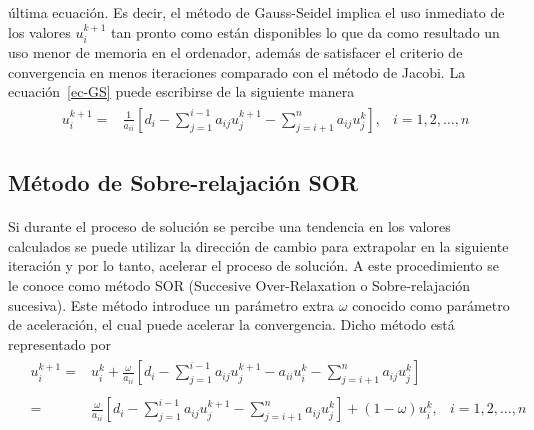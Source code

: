 \documentclass[letterpaper, openright, 12pt]{book}
\begin{document}
        última ecuación. Es decir, el método de Gauss-Seidel implica el uso
        inmediato de los valores $u_{i}^{k+1}$ tan pronto como están disponibles
        lo que da como resultado un uso menor de memoria en el ordenador, además
        de satisfacer el criterio de convergencia en menos iteraciones comparado
        con el método de Jacobi. La ecuación~\ref{ec-GS} puede escribirse de la
        siguiente manera
        \begin{align}
            &\begin{aligned}
                u_{i}^{k+1} =& \frac{1}{a_{ii}} \left[ d_{i} - \sum_{j=1}^{i-1} a_{ij}u_{j}^{k+1}  - \sum_{j = i + 1}^{n} a_{ij}u_{j}^{k} \right], &i = 1, 2, \dotsc, n
            \end{aligned}
            \label{ec-GS-2}
        \end{align}
    \subsection{Método de Sobre-relajación SOR}
    \paragraph*{}
        Si durante el proceso de solución se percibe una tendencia en los
        valores calculados se puede utilizar la dirección de cambio para
        extrapolar en la siguiente iteración y por lo tanto, acelerar el
        proceso de solución. A este procedimiento se le conoce como método SOR
        (Succesive Over-Relaxation o  Sobre-relajación sucesiva). Este método
        introduce un parámetro extra $\omega$ conocido como parámetro de
        aceleración, el cual puede acelerar la convergencia. Dicho método está
        representado por
        \begin{align}
            &\begin{aligned}
                u_{i}^{k+1} =& u_{i}^{k} + \frac{\omega}{a_{ii}} \left[ d_{i} - \sum_{j = 1}^{i - 1}a_{ij}u_{j}^{k+1} - a_{ii}u_{i}^{k} - \sum_{j = i+1}^{n} a_{ij}u_{j}^{k} \right]
                \\ \\
                =& \frac{\omega}{a_{ii}} \left[ d_{i} - \sum_{j = 1}^{i - 1} a_{ij}u_{j}^{k+1} - \sum_{j = i+1}^{n} a_{ij}u_j ^{k}\right] + \left( 1 - \omega \right) u_{i}^{k}, &i = 1, 2, \dotsc, n
            \end{aligned}
        \end{align}
\end{document}
